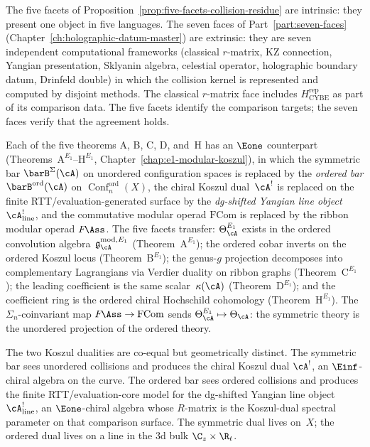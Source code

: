 \begin{remark}
\label{rem:five-facets-seven-faces}
The five facets of Proposition~\ref{prop:five-facets-collision-residue}
are intrinsic: they present one object in five languages. The seven
faces of Part~\ref{part:seven-faces}
(Chapter~\ref{ch:holographic-datum-master}) are extrinsic: they are
seven independent computational frameworks
(classical $r$-matrix, KZ connection, Yangian presentation, Sklyanin
algebra, celestial operator, holographic boundary datum, Drinfeld
double) in which the collision kernel is represented and computed by
disjoint methods.  The classical $r$-matrix face includes
$H_{\mathrm{CYBE}}^{\mathrm{rep}}$ as part of its comparison data.
The five facets identify the comparison
targets; the seven faces verify that the agreement holds.
\end{remark}

\begin{remark}
\label{rem:e1-five-theorems}
%
%
Each of the five theorems A, B, C, D, and~H has an $\Eone$ counterpart
(Theorems~$\mathrm{A}^{E_1}$--$\mathrm{H}^{E_1}$,
Chapter~\ref{chap:e1-modular-koszul}),
in which the symmetric bar $\barB^{\Sigma}(\cA)$ on unordered
configuration spaces is replaced by the
\emph{ordered bar} $\barB^{\mathrm{ord}}(\cA)$ on
$\operatorname{Conf}_n^{\mathrm{ord}}(X)$,
the chiral Koszul dual~$\cA^!$ is replaced on the finite
RTT/evaluation-generated surface by the
\emph{dg-shifted Yangian line object} $\cA^!_{\mathrm{line}}$,
and the commutative modular operad $\mathrm{FCom}$ is replaced
by the ribbon modular operad $F\!\Ass$.
The five facets transfer:
$\Theta_\cA^{E_1}$ exists in the ordered convolution
algebra~$\mathfrak{g}_{\cA}^{\mathrm{mod},E_1}$ (Theorem~$\mathrm{A}^{E_1}$);
the ordered cobar inverts on the ordered Koszul locus
(Theorem~$\mathrm{B}^{E_1}$);
the genus-$g$ projection decomposes into complementary
Lagrangians via Verdier duality on ribbon graphs
(Theorem~$\mathrm{C}^{E_1}$);
the leading coefficient is the same scalar~$\kappa(\cA)$
(Theorem~$\mathrm{D}^{E_1}$);
and the coefficient ring is the ordered chiral Hochschild
cohomology (Theorem~$\mathrm{H}^{E_1}$).
The $\Sigma_n$-coinvariant map
$F\!\Ass \to \mathrm{FCom}$
sends $\Theta_\cA^{E_1} \mapsto \Theta_\cA$:
the symmetric theory is the unordered projection of the
ordered theory.

The two Koszul dualities are co-equal but geometrically
distinct. The symmetric bar sees unordered collisions and
produces the chiral Koszul dual $\cA^!$, an
$\Einf$-chiral algebra on the curve. The ordered bar
sees ordered collisions and produces the finite RTT/evaluation-core
model for the dg-shifted Yangian line object
$\cA^!_{\mathrm{line}}$, an $\Eone$-chiral algebra whose
$R$-matrix is the Koszul-dual spectral parameter on that comparison
surface.
The symmetric dual lives on~$X$; the ordered dual
lives on a line in the $3$d bulk $\C_z \times \R_t$.
\end{remark}

